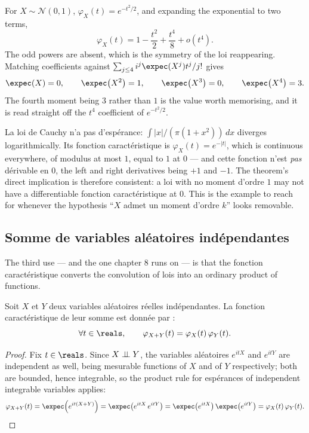 \begin{example}
For $X \sim \mathcal{N}(0,1)$, $\varphi_{X}(t) = e^{-t^{2}/2}$, and expanding the
exponential to two terms,
\[
  \varphi_{X}(t) = 1 - \frac{t^{2}}{2} + \frac{t^{4}}{8} + o\!\left(t^{4}\right).
\]
The odd powers are absent, which is the symmetry of the loi reappearing. Matching
coefficients against $\sum_{j \leq 4} i^{j}\expec(X^{j})t^{j}/j!$ gives
\[
  \expec(X) = 0, \qquad \expec\!\left(X^{2}\right) = 1, \qquad \expec\!\left(X^{3}\right) =
  0, \qquad \expec\!\left(X^{4}\right) = 3.
\]
The fourth moment being $3$ rather than $1$ is the value worth memorising, and it is read
straight off the $t^{4}$ coefficient of $e^{-t^{2}/2}$.
\end{example}

\begin{example}
La loi de Cauchy n'a pas d'espérance: $\int |x|/(\pi(1+x^{2}))\,dx$ diverges logarithmically.
Its fonction caractéristique is $\varphi_{X}(t) = e^{-|t|}$, which is continuous everywhere,
of modulus at most $1$, equal to $1$ at $0$ --- and cette fonction n'est \emph{pas} dérivable
en $0$, the left and right derivatives being $+1$ and $-1$. The theorem's direct implication
is therefore consistent: a loi with no moment d'ordre $1$ may not have a differentiable
fonction caractéristique at $0$. This is the example to reach for whenever the hypothesis
``$X$ admet un moment d'ordre $k$'' looks removable.
\end{example}

\subsection{Somme de variables aléatoires indépendantes}

The third use --- and the one chapter 8 runs on --- is that the fonction caractéristique converts
the convolution of lois into an ordinary product of functions.

\begin{prop}
Soit $X$ et $Y$ deux variables aléatoires réelles indépendantes. La fonction caractéristique
de leur somme est donnée par :
\[
  \forall t \in \reals, \qquad \varphi_{X+Y}(t) = \varphi_{X}(t)\,\varphi_{Y}(t).
\]
\end{prop}

\begin{proof}
Fix $t \in \reals$. Since $X \perp\!\!\!\perp Y$, the variables aléatoires $e^{itX}$ and $e^{itY}$ are
independent as well, being mesurable functions of $X$ and of $Y$ respectively; both are
bounded, hence integrable, so the product rule for espérances of independent integrable
variables applies:
\[
  \varphi_{X+Y}(t) = \expec\!\left(e^{it(X+Y)}\right) =
  \expec\!\left(e^{itX}\,e^{itY}\right) =
  \expec\!\left(e^{itX}\right)\expec\!\left(e^{itY}\right) = \varphi_{X}(t)\,\varphi_{Y}(t).
\]
\end{proof}

